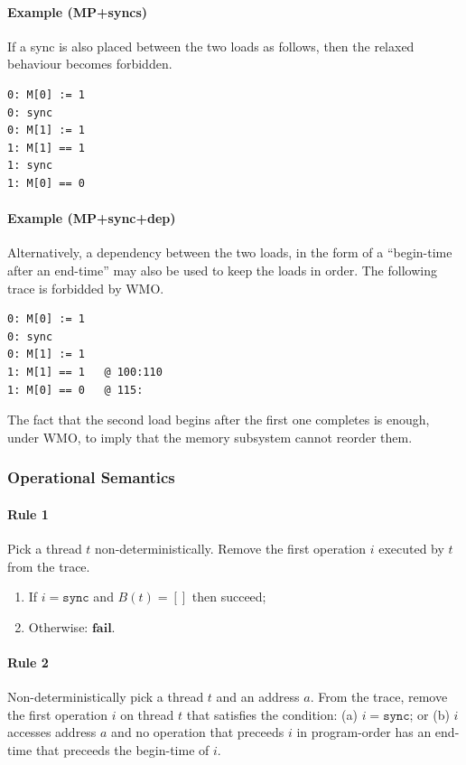 \documentclass[11pt]{article}
\begin{document}
\paragraph{Example (MP+syncs)}  If a sync is also placed between the
two loads as follows, then the relaxed behaviour becomes forbidden.

\begin{verbatim}
0: M[0] := 1
0: sync
0: M[1] := 1
1: M[1] == 1
1: sync
1: M[0] == 0
\end{verbatim}

\paragraph{Example (MP+sync+dep)} Alternatively, a dependency between
the two loads, in the form of a ``begin-time after an end-time'' may
also be used to keep the loads in order.  The following trace is
forbidded by WMO.

\begin{verbatim}
0: M[0] := 1
0: sync
0: M[1] := 1
1: M[1] == 1   @ 100:110
1: M[0] == 0   @ 115:
\end{verbatim}

\noindent The fact that the second load begins after the first one
completes is enough, under WMO, to imply that the memory subsystem
cannot reorder them.

\subsubsection*{Operational Semantics}

\paragraph{Rule 1} 

Pick a thread $t$ non-deterministically.  Remove the first operation
$i$ executed by $t$ from the trace.

\begin{enumerate}
\item
     If $i = \texttt{sync}$ and $B(t) = []$ then succeed;
\item
     Otherwise: $\textbf{fail}$.
\end{enumerate}

\paragraph{Rule 2}

Non-deterministically pick a thread $t$ and an address $a$.  From the
trace, remove the first operation $i$ on thread $t$ that satisfies the
condition: (a) $i = \texttt{sync}$; or (b) $i$ accesses address $a$
and no operation that preceeds $i$ in program-order has an end-time
that preceeds the begin-time of $i$.
\end{document}
